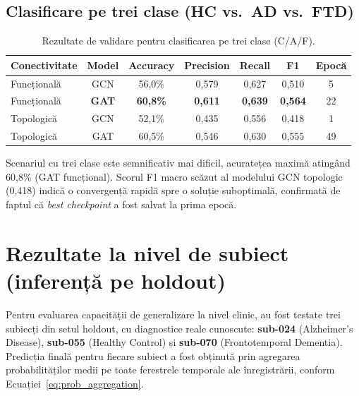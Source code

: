 \documentclass[12pt,a4paper]{report}
\theoremstyle{definition}
\theoremstyle{remark}
\begin{document}
\subsection{Clasificare pe trei clase (HC vs.\ AD vs.\ FTD)}

\begin{table}[H]
    \centering
    \caption{Rezultate de validare pentru clasificarea pe trei clase (C/A/F).}
    \label{tab:rezultate_3clase}
    \begin{tabular}{|l|c|c|c|c|c|c|}
        \hline
        \textbf{Conectivitate} & \textbf{Model} & \textbf{Accuracy} & \textbf{Precision} & \textbf{Recall} & \textbf{F1} & \textbf{Epocă} \\
        \hline
        Funcțională & GCN   & 56,0\% & 0,579 & 0,627 & 0,510 & 5  \\
        Funcțională & \textbf{GAT} & \textbf{60,8\%} & \textbf{0,611} & \textbf{0,639} & \textbf{0,564} & 22 \\
        Topologică  & GCN   & 52,1\% & 0,435 & 0,556 & 0,418 & 1  \\
        Topologică  & GAT   & 60,5\% & 0,546 & 0,630 & 0,555 & 49 \\
        \hline
    \end{tabular}
\end{table}

Scenariul cu trei clase este semnificativ mai dificil, acuratețea maximă atingând
60,8\% (GAT funcțional). Scorul F1 macro scăzut al modelului GCN topologic (0,418)
indică o convergență rapidă spre o soluție suboptimală, confirmată de faptul că
\textit{best checkpoint} a fost salvat la prima epocă.

\section{Rezultate la nivel de subiect (inferență pe holdout)}
\label{sec:rezultate_holdout}

Pentru evaluarea capacității de generalizare la nivel clinic, au fost testate trei
subiecți din setul holdout, cu diagnostice reale cunoscute: \textbf{sub-024}
(Alzheimer's Disease), \textbf{sub-055} (Healthy Control) și \textbf{sub-070}
(Frontotemporal Dementia). Predicția finală pentru fiecare subiect a fost obținută
prin agregarea probabilităților medii pe toate ferestrele temporale ale înregistrării,
conform Ecuației~\eqref{eq:prob_aggregation}.
\end{document}
